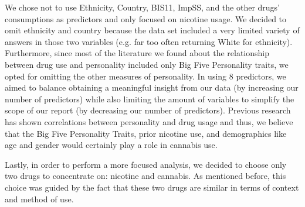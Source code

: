 \documentclass[letterpaper,10pt,english]{jupyterBook}
\begin{document}
\sphinxAtStartPar
We chose not to use Ethnicity, Country, BIS\sphinxhyphen{}11, ImpSS, and the other drugs’ consumptions as predictors and only focused on nicotine usage. We decided to omit ethnicity and country because the data set included a very limited variety of answers in those two variables (e.g. far too often returning White for ethnicity). Furthermore, since most of the literature we found about the relationship between drug use and personality included only Big Five Personality traits, we opted for omitting the other measures of personality. In using 8 predictors, we aimed to balance obtaining a meaningful insight from our data (by increasing our number of predictors) while also limiting the amount of variables to simplify the scope of our report (by decreasing our number of predictors). Previous research has shown correlations between personality and drug usage and thus, we believe that the Big Five Personality Traits, prior nicotine use, and demographics like age and gender would certainly play a role in cannabis use.

\sphinxAtStartPar
Lastly, in order to perform a more focused analysis, we decided to choose only two drugs to concentrate on: nicotine and cannabis. As mentioned before, this choice was guided by the fact that these two drugs are similar in terms of context and method of use.
\end{document}
